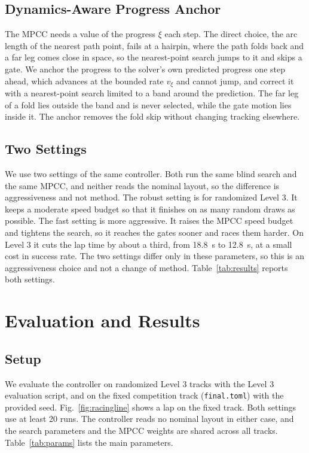 \documentclass[conference]{IEEEtran}
\begin{document}
\subsection{Dynamics-Aware Progress Anchor}
\label{sec:anchor}
The MPCC needs a value of the progress $\xi$ each step. The direct choice, the arc length of the nearest path point, fails at a hairpin, where the path folds back and a far leg comes close in space, so the nearest-point search jumps to it and skips a gate. We anchor the progress to the solver's own predicted progress one step ahead, which advances at the bounded rate $v_\xi$ and cannot jump, and correct it with a nearest-point search limited to a band around the prediction. The far leg of a fold lies outside the band and is never selected, while the gate motion lies inside it. The anchor removes the fold skip without changing tracking elsewhere.

\subsection{Two Settings}
\label{sec:settings}
We use two settings of the same controller. Both run the same blind search and the same MPCC, and neither reads the nominal layout, so the difference is aggressiveness and not method. The robust setting is for randomized Level 3. It keeps a moderate speed budget so that it finishes on as many random draws as possible. The fast setting is more aggressive. It raises the MPCC speed budget and tightens the search, so it reaches the gates sooner and races them harder. On Level 3 it cuts the lap time by about a third, from 18.8~s to 12.8~s, at a small cost in success rate. The two settings differ only in these parameters, so this is an aggressiveness choice and not a change of method. Table~\ref{tab:results} reports both settings.

\section{Evaluation and Results}
\label{sec:results}

\subsection{Setup}
We evaluate the controller on randomized Level 3 tracks with the Level 3 evaluation script, and on the fixed competition track (\texttt{final.toml}) with the provided seed. Fig.~\ref{fig:racingline} shows a lap on the fixed track. Both settings use at least 20 runs. The controller reads no nominal layout in either case, and the search parameters and the MPCC weights are shared across all tracks. Table~\ref{tab:params} lists the main parameters.
\end{document}
